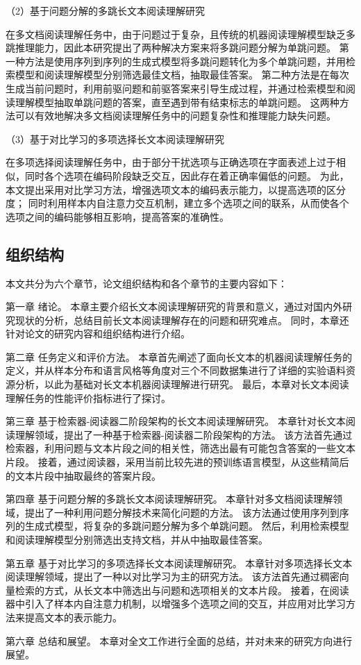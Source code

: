 （2）基于问题分解的多跳长文本阅读理解研究

在多文档阅读理解任务中，由于问题过于复杂，且传统的机器阅读理解模型缺乏多跳推理能力，因此本研究提出了两种解决方案来将多跳问题分解为单跳问题。
第一种方法是使用序列到序列的生成式模型\cite{Lewis2019BARTDS,Ni2021SentenceT5SS}将多跳问题转化为多个单跳问题，并用检索模型和阅读理解模型分别筛选最佳文档，抽取最佳答案。
第二种方法是在每次生成当前问题时，利用前驱问题和前驱答案来引导生成过程，并通过检索模型和阅读理解模型抽取单跳问题的答案，直至遇到带有结束标志的单跳问题。
这两种方法可以有效地解决多文档阅读理解任务中的问题复杂性和推理能力缺失问题。

（3）基于对比学习的多项选择长文本阅读理解研究

在多项选择阅读理解任务中，由于部分干扰选项与正确选项在字面表述上过于相似，同时各个选项在编码阶段缺乏交互，因此存在着正确率偏低的问题。
为此，本文提出采用对比学习方法\cite{gao2021simcse}，增强选项文本的编码表示能力，以提高选项的区分度；
同时利用样本内自注意力交互机制\cite{vaswani2017attention}，建立多个选项之间的联系，从而使各个选项之间的编码能够相互影响，提高答案的准确性。

\subsection{组织结构}
本文共分为六个章节，论文组织结构和各个章节的主要内容如下：

第一章 绪论。
本章主要介绍长文本阅读理解研究的背景和意义，通过对国内外研究现状的分析，总结目前长文本阅读理解存在的问题和研究难点。
同时，本章还针对论文的研究内容和组织结构进行介绍。

第二章 任务定义和评价方法。
本章首先阐述了面向长文本的机器阅读理解任务的定义，并从样本分布和语言风格等角度对三个不同数据集进行了详细的实验语料资源分析，以此为基础对长文本机器阅读理解进行研究。
最后，本章对长文本阅读理解任务的性能评价指标进行了探讨。

第三章 基于检索器-阅读器二阶段架构的长文本阅读理解研究。
本章针对长文本阅读理解领域，提出了一种基于检索器-阅读器二阶段架构的方法。
该方法首先通过检索器，利用问题与文本片段之间的相关性，筛选出最有可能包含答案的一些文本片段。
接着，通过阅读器，采用当前比较先进的预训练语言模型，从这些精简后的文本片段中抽取最终的答案片段。

第四章 基于问题分解的多跳长文本阅读理解研究。
本章针对多文档阅读理解领域，提出了一种利用问题分解技术来简化问题的方法。
该方法通过使用序列到序列的生成式模型，将复杂的多跳问题分解为多个单跳问题。
然后，利用检索模型和阅读理解模型分别筛选出支持文档，并从中抽取最佳答案。

第五章 基于对比学习的多项选择长文本阅读理解研究。
本章针对多项选择长文本阅读理解领域，提出了一种以对比学习为主的研究方法。
该方法首先通过稠密向量检索的方式，从长文本中筛选出与问题和选项相关的文本片段。
接着，在阅读器中引入了样本内自注意力机制，以增强多个选项之间的交互，并应用对比学习方法来提高文本的表示能力。

第六章 总结和展望。
本章对全文工作进行全面的总结，并对未来的研究方向进行展望。



